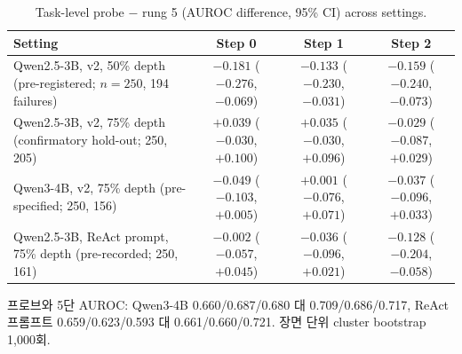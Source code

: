\begin{table}[htbp]
\centering\small
\caption{Task-level probe $-$ rung 5 (AUROC difference, 95\% CI) across settings.}\label{tab:settings}
\begin{tabularx}{\linewidth}{@{}Lccc@{}}
\toprule
Setting & Step 0 & Step 1 & Step 2 \\
\midrule
Qwen2.5-3B, v2, 50\% depth (pre-registered; $n = 250$, 194 failures) & $-0.181$ ($-0.276$, $-0.069$) & $-0.133$ ($-0.230$, $-0.031$) & $-0.159$ ($-0.240$, $-0.073$) \\
Qwen2.5-3B, v2, 75\% depth (confirmatory hold-out; 250, 205) & $+0.039$ ($-0.030$, $+0.100$) & $+0.035$ ($-0.030$, $+0.096$) & $-0.029$ ($-0.087$, $+0.029$) \\
Qwen3-4B, v2, 75\% depth (pre-specified; 250, 156) & $-0.049$ ($-0.103$, $+0.005$) & $+0.001$ ($-0.076$, $+0.071$) & $-0.037$ ($-0.096$, $+0.033$) \\
Qwen2.5-3B, ReAct prompt, 75\% depth (pre-recorded; 250, 161) & $-0.002$ ($-0.057$, $+0.045$) & $-0.036$ ($-0.096$, $+0.021$) & $-0.128$ ($-0.204$, $-0.058$) \\
\bottomrule
\end{tabularx}
\par\smallskip\raggedright\footnotesize
프로브와 5단 AUROC: Qwen3-4B 0.660/0.687/0.680 대 0.709/0.686/0.717, ReAct 프롬프트 0.659/0.623/0.593 대 0.661/0.660/0.721. 장면 단위 cluster bootstrap 1,000회.
\end{table}
